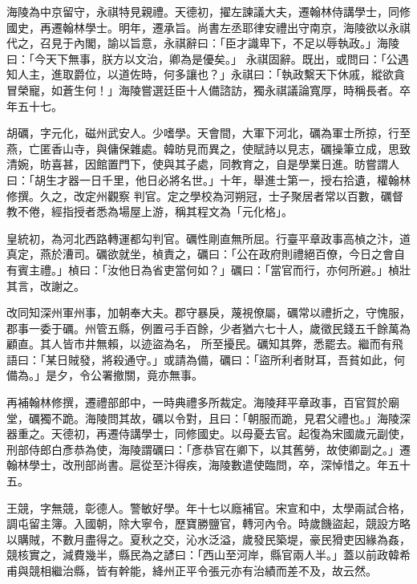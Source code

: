 \begin{pinyinscope}
 海陵為中京留守，永祺特見親禮。天德初，擢左諫議大夫，遷翰林侍講學士，同修國史，再遷翰林學士。明年，遷承旨。尚書左丞耶律安禮出守南京，海陵欲以永祺代之，召見于內閣，諭以旨意，永祺辭曰：「臣才識卑下，不足以辱執政。」海陵曰：「今天下無事，朕方以文治，卿為是優矣。」
 永祺固辭。既出，或問曰：「公遇知人主，進取爵位，以道佐時，何多讓也？」永祺曰：「執政繫天下休戚，縱欲貪冒榮寵，如蒼生何！」海陵嘗選廷臣十人備諮訪，獨永祺議論寬厚，時稱長者。卒年五十七。



 胡礪，字元化，磁州武安人。少嗜學。天會間，大軍下河北，礪為軍士所掠，行至燕，亡匿香山寺，與傭保雜處。韓昉見而異之，使賦詩以見志，礪操筆立成，思致清婉，昉喜甚，因館置門下，使與其子處，同教育之，自是學業日進。昉嘗謂人曰：「胡生才器一日千里，他日必將名世。」十年，舉進士第一，授右拾遺，權翰林修撰。久之，改定州觀察
 判官。定之學校為河朔冠，士子聚居者常以百數，礪督教不倦，經指授者悉為場屋上游，稱其程文為「元化格」。



 皇統初，為河北西路轉運都勾判官。礪性剛直無所屈。行臺平章政事高楨之汴，道真定，燕於漕司。礪欲就坐，楨責之，礪曰：「公在政府則禮絕百僚，今日之會自有賓主禮。」楨曰：「汝他日為省吏當何如？」礪曰：「當官而行，亦何所避。」楨壯其言，改謝之。



 改同知深州軍州事，加朝奉大夫。郡守暴戾，蔑視僚屬，礪常以禮折之，守愧服，郡事一委于礪。州管五縣，例置弓手百餘，少者猶六七十人，歲徵民錢五千餘萬為顧直。其人皆市井無賴，以迹盜為名，
 所至擾民。礪知其弊，悉罷去。繼而有飛語曰：「某日賊發，將殺通守。」或請為備，礪曰：「盜所利者財耳，吾貧如此，何備為。」是夕，令公署撤關，竟亦無事。



 再補翰林修撰，遷禮部郎中，一時典禮多所裁定。海陵拜平章政事，百官賀於廟堂，礪獨不跪。海陵問其故，礪以令對，且曰：「朝服而跪，見君父禮也。」海陵深器重之。天德初，再遷侍講學士，同修國史。以母憂去官。起復為宋國歲元副使，刑部侍郎白彥恭為使，海陵謂礪曰：「彥恭官在卿下，以其舊勞，故使卿副之。」遷翰林學士，改刑部尚書。扈從至汴得疾，海陵數遣使臨問，卒，深悼惜之。年五十五。



 王競，字無競，彰德人。警敏好學。年十七以廕補官。宋宣和中，太學兩試合格，調屯留主簿。入國朝，除大寧令，歷寶勝鹽官，轉河內令。時歲饑盜起，競設方略以購賊，不數月盡得之。夏秋之交，沁水泛溢，歲發民築堤，豪民猾吏因緣為姦，競核實之，減費幾半，縣民為之諺曰：「西山至河岸，縣官兩人半。」蓋以前政韓希甫與競相繼治縣，皆有幹能，絳州正平令張元亦有治績而差不及，故云然。




\end{pinyinscope}

